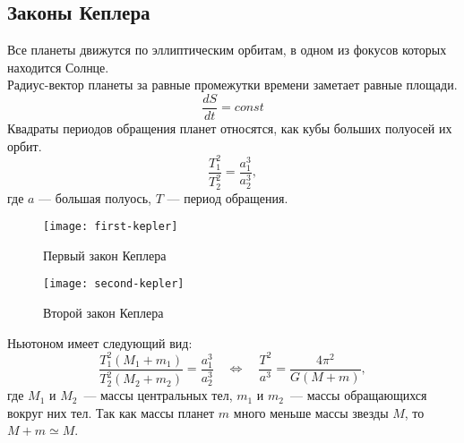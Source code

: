 \subsection{Законы Кеплера}
 Все планеты движутся по 
эллиптическим орбитам, в одном из фокусов которых 
находится Солнце.\\

 Радиус-вектор планеты за 
равные промежутки времени заметает равные площади.
\begin{equation}
\frac{dS}{dt}=const
\end{equation}
 Квадраты периодов обращения планет 
относятся, как кубы больших полуосей их орбит.
\begin{equation}
\frac{T^2_1}{T^2_2}=\frac{a^3_1}{a^3_2},
\end{equation}
где $a$ --- большая полуось, $T$ --- период обращения.
\begin{figure}[h!]
\begin{minipage}[b]{0.5\textwidth}
\centering
\texttt{[image: first-kepler]}
\caption{Первый закон Кеплера}
\end{minipage}
\begin{minipage}[b]{0.5\textwidth}
\centering
\texttt{[image: second-kepler]}
\caption {Второй закон Кеплера}
\end{minipage}
\end{figure}

 Ньютоном  имеет следующий вид:
\begin{equation}
\frac{T^2_1( M_1 + m_1)}{T^2_2( M_2 + m_2 )}=\frac{a^3_1}{a^3_2} \quad \Longleftrightarrow \quad 
	\frac{T^2}{a^3} = \frac{4 \pi^2}{G ( M + m )},
\end{equation}
где $M_1$ и $M_2$~--- массы центральных тел, $m_1$ и 
$m_2$~--- массы обращающихся вокруг них тел. Так как массы планет 
$m$ много меньше массы звезды $M$, то $M + m \simeq M$.

